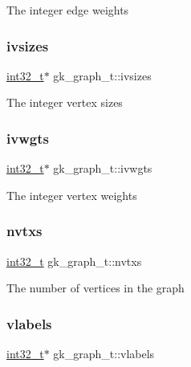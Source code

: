 The integer edge weights \mbox{\label{a00638_af90840fb29404bc157231c3975dbc99f}} 
\subsubsection{\texorpdfstring{ivsizes}{ivsizes}}
{\footnotesize\ttfamily \hyperlink{a00119_a37994e3b11c72957c6f454c6ec96d43d}{int32\+\_\+t}$\ast$ gk\+\_\+graph\+\_\+t\+::ivsizes}

The integer vertex sizes \mbox{\label{a00638_a25cd4970e41c3ee0bc919b93c9319023}} 
\subsubsection{\texorpdfstring{ivwgts}{ivwgts}}
{\footnotesize\ttfamily \hyperlink{a00119_a37994e3b11c72957c6f454c6ec96d43d}{int32\+\_\+t}$\ast$ gk\+\_\+graph\+\_\+t\+::ivwgts}

The integer vertex weights \mbox{\label{a00638_adf27e7e36c8ba4cc586bd37b303db330}} 
\subsubsection{\texorpdfstring{nvtxs}{nvtxs}}
{\footnotesize\ttfamily \hyperlink{a00119_a37994e3b11c72957c6f454c6ec96d43d}{int32\+\_\+t} gk\+\_\+graph\+\_\+t\+::nvtxs}

The number of vertices in the graph \mbox{\label{a00638_a720b0b3ecc66fcd7b1f3f280aaf074b4}} 
\subsubsection{\texorpdfstring{vlabels}{vlabels}}
{\footnotesize\ttfamily \hyperlink{a00119_a37994e3b11c72957c6f454c6ec96d43d}{int32\+\_\+t}$\ast$ gk\+\_\+graph\+\_\+t\+::vlabels}

